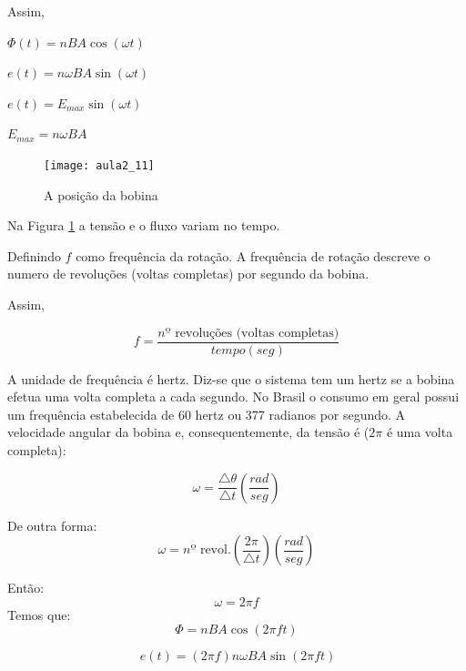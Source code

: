 Assim,

$\Phi(t)=nBA\cos(\omega t)$

$e(t)=n\omega BA\sin(\omega t)$

$e(t)=E_{max}\sin(\omega t)$

$E_{max}=n\omega BA$

\begin{figure}[H]
\begin{centering}
\texttt{[image: aula2\_11]}\protect\caption{\label{fig:aula2_11}A posição da bobina }
\end{centering}

\end{figure}

Na Figura \ref{fig:aula2_11} a tensão e o fluxo variam no tempo.

Definindo $f$ como frequência da rotação. A frequência de rotação
descreve o numero de revoluções (voltas completas) por segundo da
bobina.

Assim,

\begin{equation}\label{eq:freq}
f=\frac{n\text{º revoluções (voltas completas)}}{tempo(seg)}
\end{equation}

A unidade de frequência é hertz. Diz-se que o sistema tem um hertz
se a bobina efetua uma volta completa a cada segundo. No Brasil o
consumo em geral possui um frequência estabelecida de $60$ hertz
ou 377 radianos por segundo. 
A velocidade angular da bobina e, consequentemente, da tensão é ($2\pi$
é uma volta completa):

\begin{equation}\label{eq:omega6}
\omega=\frac{\triangle\theta}{\triangle t}(\frac{rad}{seg})
\end{equation}

De outra forma:
\begin{equation}\label{eq:omega7}
\omega=n\text{º revol.}(\frac{2\pi}{\triangle t})(\frac{rad}{seg})
\end{equation}

Então:
\begin{equation}\label{eq:omega8}
\omega=2\pi f
\end{equation}
Temos que:
\begin{equation}\label{eq:omega9}
\Phi=nBA\cos(2\pi ft)
\end{equation}

\begin{equation}\label{eq:omega10}
\ e(t)=(2\pi f)n\omega BA\sin(2\pi ft)
\end{equation}

